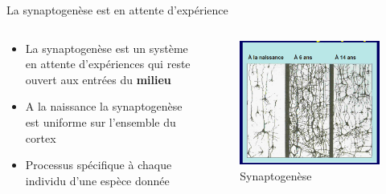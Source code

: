 \documentclass{beamer}
\begin{document}

\begin{frame}{La synaptogenèse est en attente d’expérience}
\begin{columns}
\begin{column}{0.7\textwidth}
\begin{block}{}
\begin{itemize}
    \item La synaptogenèse est un système en attente d’expériences qui reste ouvert aux entrées du \textbf{milieu}
    \item A la naissance la synaptogenèse est uniforme sur l’ensemble du cortex
    \item Processus spécifique à chaque individu d’une espèce donnée
\end{itemize}
\end{block}
\end{column}
\begin{column}{0.3\textwidth}
\begin{block}{}
\begin{figure}
    \centering
    \includegraphics[width=\textwidth]{synaptogenese.png}
    \caption{Synaptogenèse}
    \label{fig:synapto}
\end{figure}
\end{block}
\end{column}
\end{columns}
\end{frame}
\end{document}
